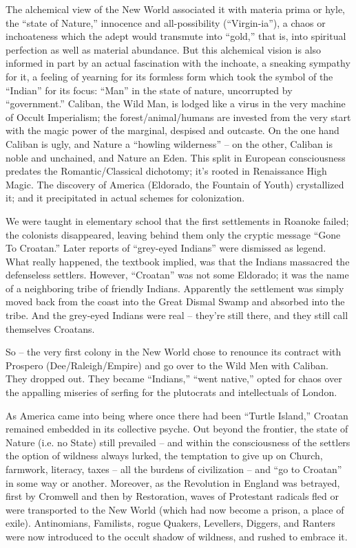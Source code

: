 \documentclass[a4paper,english,10pt,twoside]{article}
\begin{document}
\medskip
The alchemical view of the New World associated it with materia prima or hyle, the \enquote{state of Nature,} innocence and all-possibility (\enquote{Virgin-ia}), a chaos or inchoateness which the adept would transmute into \enquote{gold,} that is, into spiritual perfection as well as material abundance. But this alchemical vision is also informed in part by an actual fascination with the inchoate, a sneaking sympathy for it, a feeling of yearning for its formless form which took the symbol of the \enquote{Indian} for its focus: \enquote{Man} in the state of nature, uncorrupted by \enquote{government.} Caliban, the Wild Man, is lodged like a virus in the very machine of Occult Imperialism; the forest/animal/humans are invested from the very start with the magic power of the marginal, despised and outcaste. On the one hand Caliban is ugly, and Nature a \enquote{howling wilderness} -- on the other, Caliban is noble and unchained, and Nature an Eden. This split in European consciousness predates the Romantic/Classical dichotomy; it's rooted in Renaissance High Magic. The discovery of America (Eldorado, the Fountain of Youth) crystallized it; and it precipitated in actual schemes for colonization.

\medskip
We were taught in elementary school that the first settlements in Roanoke failed; the colonists disappeared, leaving behind them only the cryptic message \enquote{Gone To Croatan.} Later reports of \enquote{grey-eyed Indians} were dismissed as legend. What really happened, the textbook implied, was that the Indians massacred the defenseless settlers. However, \enquote{Croatan} was not some Eldorado; it was the name of a neighboring tribe of friendly Indians. Apparently the settlement was simply moved back from the coast into the Great Dismal Swamp and absorbed into the tribe. And the grey-eyed Indians were real -- they're still there, and they still call themselves Croatans.

\medskip
So -- the very first colony in the New World chose to renounce its contract with Prospero (Dee/Raleigh/Empire) and go over to the Wild Men with Caliban. They dropped out. They became \enquote{Indians,} \enquote{went native,} opted for chaos over the appalling miseries of serfing for the plutocrats and intellectuals of London.

\medskip
As America came into being where once there had been \enquote{Turtle Island,} Croatan remained embedded in its collective psyche. Out beyond the frontier, the state of Nature (i.e. no State) still prevailed -- and within the consciousness of the settlers the option of wildness always lurked, the temptation to give up on Church, farmwork, literacy, taxes --  all the burdens of civilization -- and \enquote{go to Croatan} in some way or another. Moreover, as the Revolution in England was betrayed, first by Cromwell and then by Restoration, waves of Protestant radicals fled or were transported to the New World (which had now become a prison, a place of exile). Antinomians, Familists, rogue Quakers, Levellers, Diggers, and Ranters were now introduced to the occult shadow of wildness, and rushed to embrace it.
\end{document}
